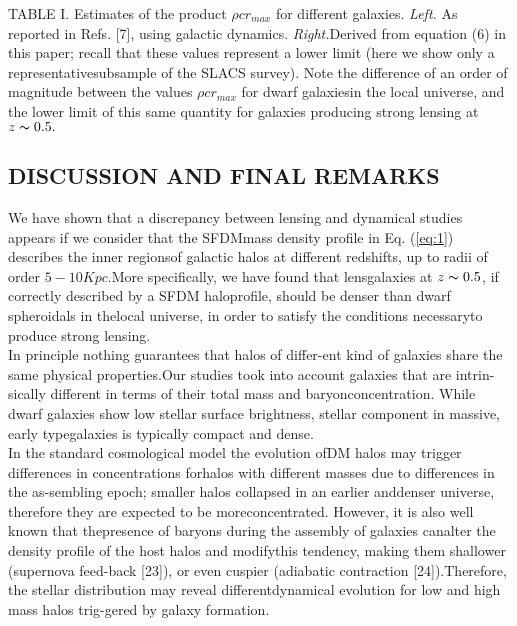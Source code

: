 \documentclass[10pt,a4paper]{article}
\begin{document}
TABLE  I.   Estimates  of  the  product $\rho c r_{max}$  for  different  galaxies. \textit{Left.} As  reported  in  Refs.   [7],  using  galactic  dynamics. \textit{Right.}Derived from equation (6) in this paper; recall that these values represent a lower limit (here we show only a representativesubsample of the SLACS survey).  Note the difference of an order of magnitude between the values $\rho c r_{max}$ for dwarf galaxiesin the local universe, and the lower limit of this same quantity for galaxies producing strong lensing at $z \thicksim 0.5.$\\

\begin{multicols}{2}
\section{\large\centering DISCUSSION AND FINAL REMARKS}
\indent
We have shown that a discrepancy between lensing and dynamical studies appears if we consider that the SFDMmass density profile in Eq. (\ref{eq:1}) describes the inner regionsof galactic halos at different redshifts, up to radii of order \(5−10 Kpc\).More  specifically,  we  have  found  that  lensgalaxies at \(z \thicksim 0.5\), if correctly described by a SFDM haloprofile,  should  be  denser  than  dwarf  spheroidals  in  thelocal universe, in order to satisfy the conditions necessaryto produce strong lensing.\\
\indent
In  principle  nothing  guarantees  that  halos  of  differ-ent kind of galaxies share the same physical properties.Our  studies  took  into  account  galaxies  that  are  intrin-sically different in terms of their total mass and baryonconcentration.  While dwarf galaxies show low stellar surface brightness, stellar component in massive, early typegalaxies is typically compact and dense.\\
\indent
In  the  standard  cosmological  model  the  evolution  ofDM  halos  may  trigger  differences  in  concentrations  forhalos with different masses due to differences in the as-sembling epoch; smaller halos collapsed in an earlier anddenser universe, therefore they are expected to be moreconcentrated.   However,  it  is  also  well  known  that  thepresence of baryons during the assembly of galaxies canalter  the  density  profile  of  the  host  halos  and  modifythis  tendency,  making  them  shallower  (supernova  feed-back  [23]),  or  even  cuspier  (adiabatic  contraction  [24]).Therefore,  the  stellar  distribution  may  reveal  differentdynamical  evolution  for  low  and  high  mass  halos  trig-gered by galaxy formation.\\

\end{multicols}
\end{document}
